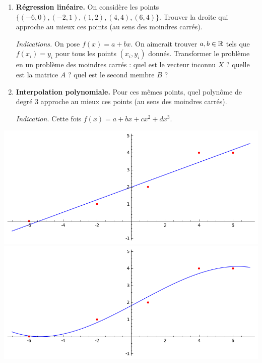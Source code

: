 \begin{frame}

\begin{tp}

\begin{enumerate}
  \item \textbf{Régression linéaire.} 
  On considère les points $\big\{(-6,0), (-2,1), (1,2), (4,4), (6,4)\big\}$.
  Trouver la droite qui approche au mieux ces points (au sens des moindres carrés).
  
  \emph{Indications.} On pose $f(x) = a +bx$. On aimerait trouver $a,b \in \mathbb{R}$ tels que 
  $f(x_i)=y_i$ pour tous les points $(x_i,y_i)$ donnés. 
  Transformer le problème en un problème des moindres carrés : quel est le vecteur inconnu $X$ ?
  quelle est la matrice $A$ ? quel est le second membre $B$ ?
    
  \item \textbf{Interpolation polynomiale.} 
  Pour ces mêmes points, quel polynôme de degré $3$ approche 
  au mieux ces points (au sens des moindres carrés).
  
  \emph{Indication.} Cette fois $f(x) = a + bx + cx^2 + dx^3$.
  
  
\end{enumerate}
 
\end{tp}
\end{frame}

\begin{frame}
\begin{center}
    \includegraphics[scale=0.4]{figures/moindres_carres1}\\[8mm]
    \pause
    \includegraphics[scale=0.4]{figures/moindres_carres2}
\end{center} 
\end{frame}


